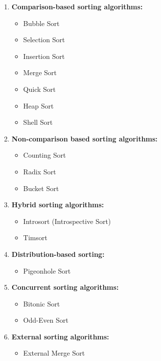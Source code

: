 \begin{enumerate}
\def\labelenumi{\arabic{enumi}.}
\tightlist
\item
  \textbf{Comparison-based sorting algorithms:}

  \begin{itemize}
  \tightlist
  \item
    Bubble Sort
  \item
    Selection Sort
  \item
    Insertion Sort
  \item
    Merge Sort
  \item
    Quick Sort
  \item
    Heap Sort
  \item
    Shell Sort
  \end{itemize}
\item
  \textbf{Non-comparison based sorting algorithms:}

  \begin{itemize}
  \tightlist
  \item
    Counting Sort
  \item
    Radix Sort
  \item
    Bucket Sort
  \end{itemize}
\item
  \textbf{Hybrid sorting algorithms:}

  \begin{itemize}
  \tightlist
  \item
    Introsort (Introspective Sort)
  \item
    Timsort
  \end{itemize}
\item
  \textbf{Distribution-based sorting:}

  \begin{itemize}
  \tightlist
  \item
    Pigeonhole Sort
  \end{itemize}
\item
  \textbf{Concurrent sorting algorithms:}

  \begin{itemize}
  \tightlist
  \item
    Bitonic Sort
  \item
    Odd-Even Sort
  \end{itemize}
\item
  \textbf{External sorting algorithms:}

  \begin{itemize}
  \tightlist
  \item
    External Merge Sort
  \end{itemize}
\end{enumerate}

